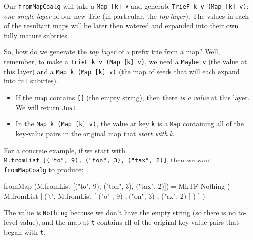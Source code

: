 \documentclass[]{article}
\newenvironment{Shaded}{}{}
\newcommand{\CharTok}[1]{\textcolor[rgb]{0.25,0.44,0.63}{#1}}
\newcommand{\DataTypeTok}[1]{\textcolor[rgb]{0.56,0.13,0.00}{#1}}
\newcommand{\DecValTok}[1]{\textcolor[rgb]{0.25,0.63,0.44}{#1}}
\newcommand{\FunctionTok}[1]{\textcolor[rgb]{0.02,0.16,0.49}{#1}}
\newcommand{\NormalTok}[1]{#1}
\newcommand{\StringTok}[1]{\textcolor[rgb]{0.25,0.44,0.63}{#1}}
\begin{document}
Our \texttt{fromMapCoalg} will take a \texttt{Map\ {[}k{]}\ v} and generate
\texttt{TrieF\ k\ v\ (Map\ {[}k{]}\ v)}: \emph{one single layer} of our new Trie
(in particular, the \emph{top layer}). The values in each of the resultant maps
will be later then watered and expanded into their own fully mature subtries.

So, how do we generate the \emph{top layer} of a prefix trie from a map? Well,
remember, to make a \texttt{TrieF\ k\ v\ (Map\ {[}k{]}\ v)}, we need a
\texttt{Maybe\ v} (the value at this layer) and a
\texttt{Map\ k\ (Map\ {[}k{]}\ v)} (the map of seeds that will each expand into
full subtries).

\begin{itemize}
\tightlist
\item
  If the map contains \texttt{{[}{]}} (the empty string), then there \emph{is a
  value} at this layer. We will return \texttt{Just}.
\item
  In the \texttt{Map\ k\ (Map\ {[}k{]}\ v)}, the value at key \texttt{k} is a
  \texttt{Map} containing all of the key-value pairs in the original map that
  \emph{start with k}.
\end{itemize}

For a concrete example, if we start with
\texttt{M.fromList\ {[}("to",\ 9),\ ("ton",\ 3),\ ("tax",\ 2){]}}, then we want
\texttt{fromMapCoalg} to produce:

\begin{Shaded}
\begin{Highlighting}[]
\NormalTok{fromMap (M.fromList [(}\StringTok{"to"}\NormalTok{, }\DecValTok{9}\NormalTok{), (}\StringTok{"ton"}\NormalTok{, }\DecValTok{3}\NormalTok{), (}\StringTok{"tax"}\NormalTok{, }\DecValTok{2}\NormalTok{)])}
    \FunctionTok{=} \DataTypeTok{MkTF} \DataTypeTok{Nothing}\NormalTok{ (}
\NormalTok{          M.fromList [}
\NormalTok{            (}\CharTok{'t'}\NormalTok{, M.fromList [}
\NormalTok{                (}\StringTok{"o"}\NormalTok{ , }\DecValTok{9}\NormalTok{)}
\NormalTok{              , (}\StringTok{"on"}\NormalTok{, }\DecValTok{3}\NormalTok{)}
\NormalTok{              , (}\StringTok{"ax"}\NormalTok{, }\DecValTok{2}\NormalTok{)}
\NormalTok{              ]}
\NormalTok{            )}
\NormalTok{          ]}
\NormalTok{        )}
\end{Highlighting}
\end{Shaded}

The value is \texttt{Nothing} because we don't have the empty string (so there
is no to-level value), and the map at \texttt{t} contains all of the original
key-value pairs that began with \texttt{t}.
\end{document}
